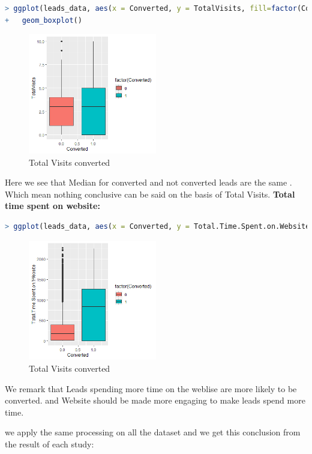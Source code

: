 \begin{lstlisting}[language=R]
> ggplot(leads_data, aes(x = Converted, y = TotalVisits, fill=factor(Converted))) +
+   geom_boxplot() 
\end{lstlisting}
\begin{figure}[H]
		\centering
    \includegraphics[width=0.5\textwidth]{assets/conn.png}
    \caption{Total Visits converted}	
\end{figure}
Here we see that Median for converted and not converted leads are the same . Which mean nothing conclusive can be said on the basis of Total Visits.
\textbf{Total time spent on website: }
\begin{lstlisting}[language=R]
> ggplot(leads_data, aes(x = Converted, y = Total.Time.Spent.on.Website, fill=factor(Converted))) + geom_boxplot()
\end{lstlisting}
\begin{figure}[H]
		\centering
    \includegraphics[width=0.5\textwidth]{assets/time.png}
    \caption{Total Visits converted}	
\end{figure}
We remark that Leads spending more time on the weblise are more likely to be converted. and Website should be made more engaging to make leads spend more time.

we apply  the same processing on all the dataset and we get this conclusion from the result of each study:

